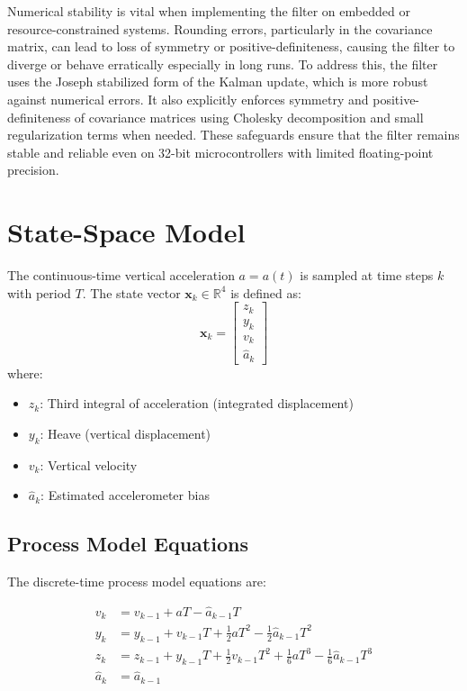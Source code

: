 \documentclass[11pt,letterpaper]{article}
\begin{document}
Numerical stability is vital when implementing the filter on embedded or resource-constrained systems. Rounding errors, particularly in the covariance matrix, can lead to loss of symmetry or positive-definiteness, causing the filter to diverge or behave erratically especially in long runs. To address this, the filter uses the Joseph stabilized form of the Kalman update, which is more robust against numerical errors. It also explicitly enforces symmetry and positive-definiteness of covariance matrices using Cholesky decomposition and small regularization terms when needed. These safeguards ensure that the filter remains stable and reliable even on 32-bit microcontrollers with limited floating-point precision.

\section{State-Space Model}

The continuous-time vertical acceleration \( a = a(t) \) is sampled at time steps \( k \) with period \( T \). The state vector \( \mathbf{x}_k \in \mathbb{R}^4 \) is defined as:
\begin{equation}
\mathbf{x}_k = \begin{bmatrix}
z_k \\
y_k \\
v_k \\
\hat{a}_k
\end{bmatrix}
\end{equation}
where:
\begin{itemize}
  \item \( z_k \): Third integral of acceleration (integrated displacement)
  \item \( y_k \): Heave (vertical displacement)
  \item \( v_k \): Vertical velocity
  \item \( \hat{a}_k \): Estimated accelerometer bias
\end{itemize}



\subsection{Process Model Equations}

The discrete-time process model equations are:

\begin{align}
v_k &= v_{k-1} + a T - \hat{a}_{k-1} T \\
y_k &= y_{k-1} + v_{k-1} T + \frac{1}{2}a T^2 - \frac{1}{2}\hat{a}_{k-1} T^2 \\
z_k &= z_{k-1} + y_{k-1} T + \frac{1}{2}v_{k-1} T^2 + \frac{1}{6}a T^3 - \frac{1}{6}\hat{a}_{k-1} T^3 \\
\hat{a}_k &= \hat{a}_{k-1}
\end{align}
\end{document}
